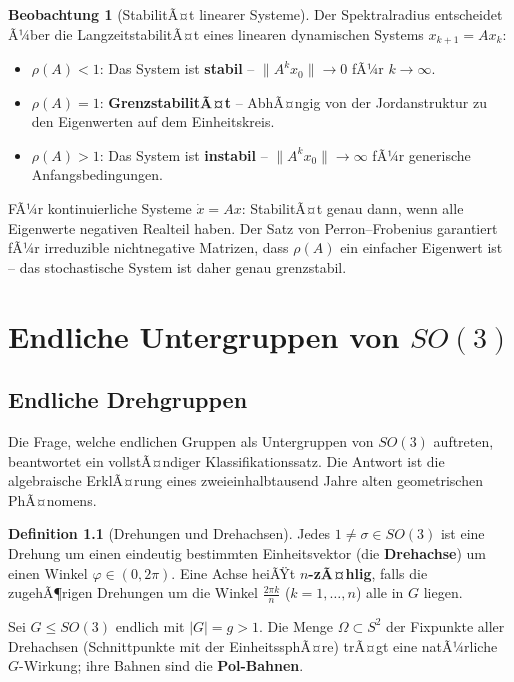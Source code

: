 ﻿\documentclass[a4paper,12pt]{report}
\theoremstyle{definition}
\newtheorem{definition}{Definition}
\newtheorem{beobachtung}{Beobachtung}
\begin{document}
\begin{beobachtung}[StabilitÃ¤t linearer Systeme]
    Der Spektralradius entscheidet Ã¼ber die LangzeitstabilitÃ¤t eines
    linearen dynamischen Systems $x_{k+1} = Ax_k$:
    \begin{itemize}
        \item[-] $\rho(A) < 1$: Das System ist \textbf{stabil} --
              $\|A^k x_0\| \to 0$ fÃ¼r $k \to \infty$.
        \item[-] $\rho(A) = 1$: \textbf{GrenzstabilitÃ¤t} --
              AbhÃ¤ngig von der Jordanstruktur zu den Eigenwerten
              auf dem Einheitskreis.
        \item[-] $\rho(A) > 1$: Das System ist \textbf{instabil} --
              $\|A^k x_0\| \to \infty$ fÃ¼r generische Anfangsbedingungen.
    \end{itemize}
    FÃ¼r kontinuierliche Systeme $\dot{x} = Ax$: StabilitÃ¤t genau
    dann, wenn alle Eigenwerte negativen Realteil haben.
    Der Satz von Perron--Frobenius garantiert fÃ¼r irreduzible
    nichtnegative Matrizen, dass $\rho(A)$ ein einfacher Eigenwert ist --
    das stochastische System ist daher genau grenzstabil.
\end{beobachtung}

\chapter{Endliche Untergruppen von $SO(3)$}

\section{Endliche Drehgruppen}

Die Frage, welche endlichen Gruppen als Untergruppen von $SO(3)$ auftreten,
beantwortet ein vollstÃ¤ndiger Klassifikationssatz. Die Antwort ist
die algebraische ErklÃ¤rung eines zweieinhalbtausend Jahre alten geometrischen PhÃ¤nomens.

\begin{definition}[Drehungen und Drehachsen]
    Jedes $1 \neq \sigma \in SO(3)$ ist eine Drehung um einen eindeutig
    bestimmten Einheitsvektor (die \textbf{Drehachse}) um einen Winkel
    $\varphi \in (0, 2\pi)$. Eine Achse heiÃŸt \textbf{$n$-zÃ¤hlig},
    falls die zugehÃ¶rigen Drehungen um die Winkel $\frac{2\pi k}{n}$
    ($k = 1, \ldots, n$) alle in $G$ liegen.

    Sei $G \leq SO(3)$ endlich mit $|G| = g > 1$.
    Die Menge $\Omega \subset S^2$ der Fixpunkte aller Drehachsen
    (Schnittpunkte mit der EinheitssphÃ¤re) trÃ¤gt eine natÃ¼rliche
    $G$-Wirkung; ihre Bahnen sind die \textbf{Pol-Bahnen}.
\end{definition}
\end{document}
